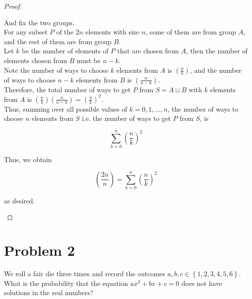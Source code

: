 \documentclass{qlnotes-export}
\begin{document}
\begin{proof}
\begin{itemize}
  And fix the two groups.\\
  For any subset \(P\) of the \(2n\) elements with size \(n\), some of them are from group \(A\), and the rest of them are from group \(B\).\\
  Let \(k\) be the number of elements of \(P\) that are chosen from \(A\), then the number of elements chosen from \(B\) must be \(n - k\).\\
  Note the number of ways to choose \(k\) elements from \(A\) is \(\left( \frac{n}{k} \right)\), and the number of ways to choose \(n - k\) elements from \(B\) is \(\left( \frac{n}{n - k} \right)\).\\
  Therefore, the total number of ways to get \(P\) from \(S = A \sqcup B\) with \(k\) elements from \(A\) is \(\left( \frac{n}{k} \right)\left( \frac{n}{n - k} \right) = \left( \frac{n}{k} \right)^{2}\).\\
  Thus, summing over all possible values of \(k = 0,1,\ldots,n\), the number of ways to choose \(n\) elements from \(S\) i.e. the number of ways to get \(P\) from \(S\), is

  \[\sum\limits_{k = 0}^{n}\left( \frac{n}{k} \right)^{2}\]

  Thus, we obtain

  \[\left( \frac{2n}{n} \right) = \sum\limits_{k = 0}^{n}\left( \frac{n}{k} \right)^{2}\]

  as desired.
\end{itemize}

\end{proof}

\section{Problem 2}\label{problem-2-1}

We roll a fair die three times and record the outcomes \(a,b,c \in \left\{ {1,2,3,4,5,6} \right\}\). What is the probability that the equation \(ax^{2} + bx + c = 0\) does not have solutions in the real numbers?
\end{document}
